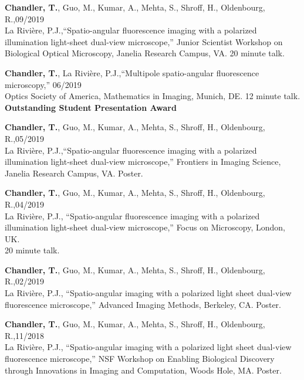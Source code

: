 \documentclass[12pt,letterpaper]{article}
\begin{document}
\begin{benumerate}{12}
\item {\textbf{Chandler, T.}, Guo, M., Kumar, A., Mehta, S., Shroff, H., Oldenbourg, R.,\hfill 09/2019\\ La Rivi\`ere, P.J.,``Spatio-angular fluorescence imaging with a polarized\\ illumination light-sheet dual-view microscope,'' Junior Scientist Workshop on\\ Biological Optical Microscopy, Janelia Research Campus, VA. 20 minute talk.}

\item {\textbf{Chandler, T.}, La Rivi\`ere, P.J.,``Multipole spatio-angular fluorescence microscopy,'' \hfill 06/2019\\ Optics Society of America, Mathematics in Imaging, Munich, DE. 12 minute talk.\\ \textbf{Outstanding Student Presentation Award}}

\item {\textbf{Chandler, T.}, Guo, M., Kumar, A., Mehta, S., Shroff, H., Oldenbourg, R.,\hfill 05/2019\\ La Rivi\`ere, P.J.,``Spatio-angular fluorescence imaging with a polarized\\ illumination light-sheet dual-view microscope,'' Frontiers in Imaging Science,\\ Janelia Research Campus, VA. Poster.}

\item {\textbf{Chandler, T.}, Guo, M., Kumar, A., Mehta, S., Shroff, H., Oldenbourg, R.,\hfill 04/2019\\ La Rivi\`ere, P.J., ``Spatio-angular fluorescence imaging with a polarized\\ illumination light-sheet dual-view microscope,'' Focus on Microscopy, London, UK.\\ 20 minute talk.}

\item {\textbf{Chandler, T.}, Guo, M., Kumar, A., Mehta, S., Shroff, H., Oldenbourg, R.,\hfill 02/2019\\ La Rivi\`ere, P.J., ``Spatio-angular imaging with a polarized light sheet dual-view\\ fluorescence microscope,'' Advanced Imaging Methods, Berkeley, CA. Poster.}

\item {\textbf{Chandler, T.}, Guo, M., Kumar, A., Mehta, S., Shroff, H., Oldenbourg, R.,\hfill 11/2018\\ La Rivi\`ere, P.J., ``Spatio-angular imaging with a polarized light sheet dual-view \\ fluorescence microscope,'' NSF Workshop on Enabling Biological Discovery\\ through Innovations in Imaging and Computation, Woods Hole, MA. Poster.}


\end{benumerate}
\end{document}
